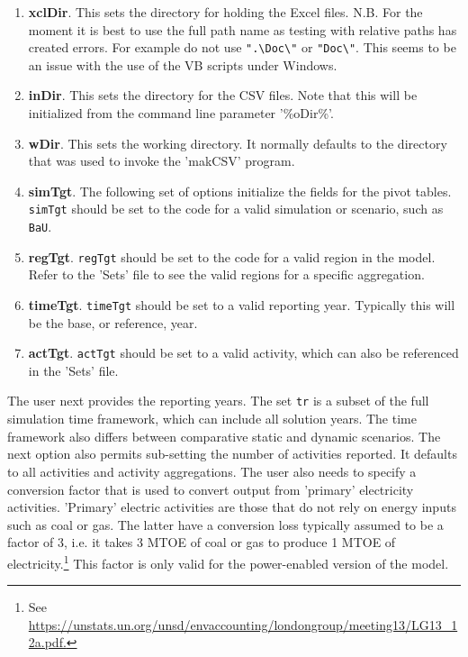\begin{enumerate}
\item \textbf{xclDir}. This sets the directory for holding the Excel files. N.B. For
the moment it is best to use the full path name as testing with relative paths
has created errors. For example do not use \texttt{".\textbackslash Doc\textbackslash"} or \texttt{"Doc\textbackslash"}.
This seems to be an issue with the use of the VB scripts under Windows.
\item \textbf{inDir}. This sets the directory for the CSV files. Note that this
will be initialized from the command line parameter '\%oDir\%'.
\item \textbf{wDir}. This sets the working directory. It normally defaults to
the directory that was used to invoke the 'makCSV' program.
\item \textbf{simTgt}. The following set of options initialize the fields for
the pivot tables. \texttt{simTgt} should be set to the code for a valid simulation
or scenario, such as \texttt{BaU}.
\item \textbf{regTgt}. \texttt{regTgt} should be set to the code for a valid region
in the model. Refer to the 'Sets' file to see the valid regions for a specific aggregation.
\item \textbf{timeTgt}. \texttt{timeTgt} should be set to a valid reporting year. Typically
this will be the base, or reference, year.
\item \textbf{actTgt}. \texttt{actTgt} should be set to a valid activity, which
can also be referenced in the 'Sets' file.
\end{enumerate}

The user next provides the reporting years. The set \texttt{tr} is a subset of the
full simulation time framework, which can include all solution years. The time
framework also differs between comparative static and dynamic scenarios. The next
option also permits sub-setting the number of activities reported. It defaults to
all activities and activity aggregations. The user also needs to specify a
conversion factor that is used to convert output from 'primary' electricity
activities. 'Primary' electric activities are those that do not rely on
energy inputs such as coal or gas. The latter have a conversion loss typically
assumed to be a factor of 3, i.e. it takes 3 MTOE of coal or gas to produce
1 MTOE of electricity.\footnote{See \url{https://unstats.un.org/unsd/envaccounting/londongroup/meeting13/LG13_12a.pdf.}}
This factor is only valid for the power-enabled version of the model.

